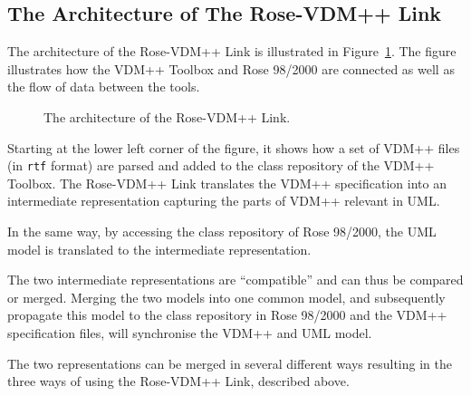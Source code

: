 \documentclass[\pformat,12pt]{article}
\newcommand{\vdmpp}{VDM++}
\newcommand{\link}{Rose-\vdmpp{} Link}
\newcommand{\rose}{Rose 98/2000}
\begin{document}
\subsection{The Architecture of The Rose-VDM++ Link}
\label{architecture}  

The architecture of the \link{} is illustrated in
Figure~\ref{fig:architecture}.  The figure illustrates how the
\vdmpp{} Toolbox and \rose{} are connected as well as the flow of data
between the tools.

\begin{figure}[htb]
\begin{center}
\mbox{}
\caption{The architecture of the \link{}.\label{fig:architecture}}
\end{center}
\end{figure}

Starting at the lower left corner of the figure, it shows how a set
of \vdmpp{} files (in {\tt rtf} format) are parsed and added to the class repository of
the \vdmpp{} Toolbox. The \link{} translates the \vdmpp{} specification
into an intermediate representation capturing the parts of \vdmpp{}
relevant in UML.

In the same way, by accessing the class repository of \rose{}, the UML
model is translated to the intermediate representation.

The two intermediate representations are ``compatible'' and can thus
be compared or merged. Merging the two models into one common model,
and subsequently propagate this model to the class repository in
\rose{} and the \vdmpp{} specification files, will synchronise the
\vdmpp{} and UML model.

The two representations can be merged in several different ways
resulting in the three ways of using the \link{}, described above.
\end{document}
